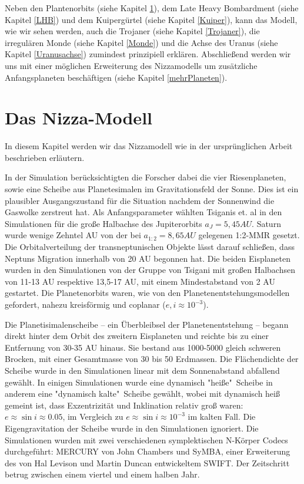 \documentclass[10pt,a4paper,twoside]{article}
\newcommand{\refsec}[1]{siehe Kapitel \ref{#1}}
\begin{document}
Neben den Plantenorbits (\refsec{Orbits}), dem Late Heavy Bombardment (\refsec{LHB}) und dem Kuipergürtel (\refsec{Kuiper}), kann das Modell, wie wir sehen werden, auch die Trojaner (\refsec{Trojaner}), die irregulären Monde (\refsec{Monde}) und die Achse des Uranus (\refsec{Uranusachse}) zumindest prinzipiell erklären.
Abschließend werden wir uns mit einer möglichen Erweiterung des Nizzamodells um zusätzliche Anfangsplaneten beschäftigen (\refsec{mehrPlaneten}).

\section{Das Nizza-Modell}\label{Orbits}
In diesem Kapitel werden wir das Nizzamodell wie in der ursprünglichen Arbeit\cite{Tsiganis2005} beschrieben erläutern.

In der Simulation berücksichtigten die Forscher dabei die vier Riesenplaneten, sowie eine Scheibe aus Planetesimalen im Gravitationsfeld der Sonne. %
Dies ist ein plausibler Ausgangszustand für die Situation nachdem der Sonnenwind die Gaswolke %
zerstreut hat. %
Als Anfangsparameter wählten Tsiganis et. al in den Simulationen für die große Halbachse des Jupiterorbits $a_J = 5,45 AU$. Saturn wurde wenige Zehntel AU von der bei $a_{1:2} = 8,65 AU$ gelegenen 1:2-MMR gesetzt\cite{Tsiganis2005}. Die Orbitalverteilung der transneptunischen Objekte lässt darauf schließen, dass Neptuns Migration innerhalb von 20 AU begonnen hat\cite{Tsiganis2005}. %
Die beiden Eisplaneten wurden in den Simulationen von der Gruppe von Tsigani mit großen Halbachsen von 11-13 AU respektive 13,5-17 AU, mit einem Mindestabstand von 2 AU gestartet.
Die Planetenorbits waren, wie von den Planetenentstehungsmodellen gefordert, %
nahezu kreisförmig und coplanar ($e, i \approx 10^{-3}$).

Die Planetisimalenscheibe – ein Überbleibsel der Planetenentstehung – begann direkt hinter dem Orbit des zweitern Eisplaneten und reichte bis zu einer Entfernung von 30-35 AU\cite{Tsiganis2005} hinaus. Sie bestand aus 1000-5000 gleich schweren Brocken, mit einer Gesamtmasse von 30 bis 50 Erdmassen. %
Die Flächendichte der Scheibe wurde in den Simulationen linear mit dem Sonnenabstand abfallend gewählt. In einigen Simulationen wurde eine dynamisch "heiße"\ Scheibe in anderem eine "dynamisch kalte"\ Scheibe gewählt, wobei mit dynamisch heiß gemeint ist, dass Exzentrizität und Inklination relativ groß waren: $e \approx \sin i \approx 0.05 $, im Vergleich zu $e \approx \sin i \approx 10^{-3} $ im kalten Fall.\cite{Tsiganis2005}
Die Eigengravitation der Scheibe wurde in den Simulationen ignoriert\cite{Tsiganis2005}.
Die Simulationen wurden mit zwei verschiedenen symplektischen N-Körper Codecs durchgeführt: MERCURY von John Chambers und SyMBA, einer Erweiterung des von Hal Levison und Martin Duncan entwickeltem SWIFT.
Der Zeitschritt betrug zwischen einem viertel und einem halben Jahr.\cite{Tsiganis2005} %
\end{document}
